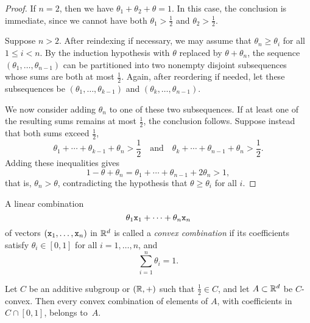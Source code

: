 \begin{proof}
    If $n = 2$, then we have $\theta_1 + \theta_2 + \theta = 1$. In this case, the conclusion is immediate, since we cannot have both $\theta_1 > \frac{1}{2}$ and $\theta_2 > \frac{1}{2}$.

    Suppose $n > 2$. After reindexing if necessary, we may assume that $\theta_n \ge \theta_i$ for all $1 \le i < n$. By the induction hypothesis with $\theta$ replaced by $\theta+\theta_n$, the sequence $(\theta_1, \dots, \theta_{n-1})$ can be partitioned into two nonempty disjoint subsequences whose sums are both at most $\frac{1}{2}$. Again, after reordering if needed, let these subsequences be $(\theta_1, \dots, \theta_{k-1})$ and $(\theta_k, \dots, \theta_{n-1})$.

    We now consider adding $\theta_n$ to one of these two subsequences. If at least one of the resulting sums remains at most $\frac{1}{2}$, the conclusion follows. Suppose instead that both sums exceed $\frac{1}{2}$,
    \[
        \theta_1 + \cdots + \theta_{k-1} + \theta_n > \frac{1}{2}
        \quad\text{and}\quad
        \theta_k + \cdots + \theta_{n-1} + \theta_n > \frac{1}{2}.
    \]
    Adding these inequalities gives
    \[
        1 - \theta + \theta_n = 
        \theta_1 + \cdots + \theta_{n-1} + 2\theta_n > 1,
    \]
    that is, $\theta_n > \theta$, contradicting the hypothesis that $\theta \ge \theta_i$ for all $i$. 
    
\end{proof}

    A linear combination
    $$
        \theta_1\mathtt x_1+\cdots+\theta_n\mathtt x_n
    $$
    of vectors\/ $(\mathtt x_1,\dots,\mathtt x_n)$ in\/ $\mathbb{R}^d$ is called a \textsl{convex combination} if its coefficients satisfy\/ $\theta_i \in [0,1]$ for all\/ $i=1,\dots,n$, and
    $$
        \sum_{i=1}^n\theta_i=1.
    $$

\begin{thm}\label{thm:convex-combinations}
    Let\/ $C$ be an additive subgroup or $(\mathbb{R},+)$ such that\/ $\frac12 \in C$, and let\/ $A \subset \mathbb{R}^d$ be $C$-convex. Then every convex combination of elements of $A$, with coefficients in $C\cap[0,1]$, belongs to\/~$A$.
\end{thm}


